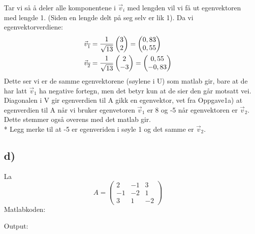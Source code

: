 \documentclass[a4paper, norsk, twoside, 10pt]{article}
\begin{document}
Tar vi så å deler alle komponentene i $\vec{v}_{i}$ med lengden vil vi få ut egenvektoren med lengde 1. (Siden en lengde delt på seg selv er lik 1). Da vi egenvektorverdiene:
\[\begin{split}
\vec{v}_{\overline{1}} &= \frac{1}{\sqrt{13}}\begin{pmatrix} 3 \\ 2 \end{pmatrix} =
  \begin{pmatrix}
    0,83\\
    0,55
  \end{pmatrix} \\*
\vec{v}_{\overline{2}} &= \frac{1}{\sqrt{13}}\begin{pmatrix} 2\\ -3 \end{pmatrix} =
  \begin{pmatrix}
    0,55\\
    -0,83
  \end{pmatrix}
\end{split}\]
Dette ser vi er de samme egenvektorene (søylene i U) som matlab gir, bare at de har latt $\vec{v}_{1}$ ha negative fortegn, men det betyr kun at de sier den går motsatt vei.
Diagonalen i V gir egenverdien til A gikk en egenvektor, vet fra Oppgave1a) at egenverdien til A når vi bruker egenvetoren $\vec{v}_{1}$ er 8 og -5 når egenvektoren er $\vec{v}_{2}$. Dette stemmer også overens med det matlab gir. \\*
Legg merke til at -5 er egenveriden i søyle 1 og det samme er $\vec{v}_{2}$.





\subsection*{d)}
\def\matriseAD{
  \begin{pmatrix}
    2 & -1 & 3 \\
    -1 & -2 & 1 \\
    3 & 1 & -2
  \end{pmatrix}
}
La \[A = \matriseAD\]
Matlabkoden:

Output:

\end{document}
